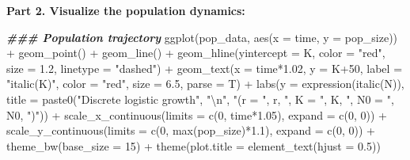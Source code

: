 \documentclass[
]{book}
\newenvironment{Shaded}{\begin{snugshade}}{\end{snugshade}}
\newcommand{\AttributeTok}[1]{\textcolor[rgb]{0.77,0.63,0.00}{#1}}
\newcommand{\DecValTok}[1]{\textcolor[rgb]{0.00,0.00,0.81}{#1}}
\newcommand{\DocumentationTok}[1]{\textcolor[rgb]{0.56,0.35,0.01}{\textbf{\textit{#1}}}}
\newcommand{\FloatTok}[1]{\textcolor[rgb]{0.00,0.00,0.81}{#1}}
\newcommand{\FunctionTok}[1]{\textcolor[rgb]{0.00,0.00,0.00}{#1}}
\newcommand{\NormalTok}[1]{#1}
\newcommand{\SpecialCharTok}[1]{\textcolor[rgb]{0.00,0.00,0.00}{#1}}
\newcommand{\StringTok}[1]{\textcolor[rgb]{0.31,0.60,0.02}{#1}}
\begin{document}
\textbf{Part 2. Visualize the population dynamics:}

\begin{Shaded}
\begin{Highlighting}[]
\DocumentationTok{\#\#\# Population trajectory}
\FunctionTok{ggplot}\NormalTok{(pop\_data, }\FunctionTok{aes}\NormalTok{(}\AttributeTok{x =}\NormalTok{ time, }\AttributeTok{y =}\NormalTok{ pop\_size)) }\SpecialCharTok{+} 
  \FunctionTok{geom\_point}\NormalTok{() }\SpecialCharTok{+} 
  \FunctionTok{geom\_line}\NormalTok{() }\SpecialCharTok{+}
  \FunctionTok{geom\_hline}\NormalTok{(}\AttributeTok{yintercept =}\NormalTok{ K, }\AttributeTok{color =} \StringTok{"red"}\NormalTok{, }\AttributeTok{size =} \FloatTok{1.2}\NormalTok{, }\AttributeTok{linetype =} \StringTok{"dashed"}\NormalTok{) }\SpecialCharTok{+} 
  \FunctionTok{geom\_text}\NormalTok{(}\AttributeTok{x =}\NormalTok{ time}\SpecialCharTok{*}\FloatTok{1.02}\NormalTok{, }\AttributeTok{y =}\NormalTok{ K}\SpecialCharTok{+}\DecValTok{50}\NormalTok{, }\AttributeTok{label =} \StringTok{"italic(K)"}\NormalTok{, }\AttributeTok{color =} \StringTok{"red"}\NormalTok{, }\AttributeTok{size =} \FloatTok{6.5}\NormalTok{, }\AttributeTok{parse =}\NormalTok{ T) }\SpecialCharTok{+}
  \FunctionTok{labs}\NormalTok{(}\AttributeTok{y =} \FunctionTok{expression}\NormalTok{(}\FunctionTok{italic}\NormalTok{(N)), }\AttributeTok{title =} \FunctionTok{paste0}\NormalTok{(}\StringTok{"Discrete logistic growth"}\NormalTok{, }\StringTok{"}\SpecialCharTok{\textbackslash{}n}\StringTok{"}\NormalTok{, }\StringTok{"(r = "}\NormalTok{, r, }\StringTok{", K = "}\NormalTok{, K, }\StringTok{", N0 = "}\NormalTok{, N0, }\StringTok{")"}\NormalTok{)) }\SpecialCharTok{+} 
  \FunctionTok{scale\_x\_continuous}\NormalTok{(}\AttributeTok{limits =} \FunctionTok{c}\NormalTok{(}\DecValTok{0}\NormalTok{, time}\SpecialCharTok{*}\FloatTok{1.05}\NormalTok{), }\AttributeTok{expand =} \FunctionTok{c}\NormalTok{(}\DecValTok{0}\NormalTok{, }\DecValTok{0}\NormalTok{)) }\SpecialCharTok{+} 
  \FunctionTok{scale\_y\_continuous}\NormalTok{(}\AttributeTok{limits =} \FunctionTok{c}\NormalTok{(}\DecValTok{0}\NormalTok{, }\FunctionTok{max}\NormalTok{(pop\_size)}\SpecialCharTok{*}\FloatTok{1.1}\NormalTok{), }\AttributeTok{expand =} \FunctionTok{c}\NormalTok{(}\DecValTok{0}\NormalTok{, }\DecValTok{0}\NormalTok{)) }\SpecialCharTok{+} 
  \FunctionTok{theme\_bw}\NormalTok{(}\AttributeTok{base\_size =} \DecValTok{15}\NormalTok{) }\SpecialCharTok{+}
  \FunctionTok{theme}\NormalTok{(}\AttributeTok{plot.title =} \FunctionTok{element\_text}\NormalTok{(}\AttributeTok{hjust =} \FloatTok{0.5}\NormalTok{))}
\end{Highlighting}
\end{Shaded}
\end{document}
